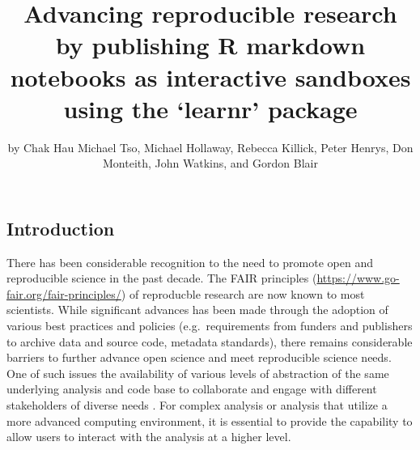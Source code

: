 \title{Advancing reproducible research by publishing R markdown notebooks as
interactive sandboxes using the `learnr' package}
\author{by Chak Hau Michael Tso, Michael Hollaway, Rebecca Killick, Peter Henrys, Don Monteith, John Watkins, and Gordon Blair}

\maketitle


\hypertarget{introduction}{%
\subsection{Introduction}\label{introduction}}

There has been considerable recognition to the need to promote open and
reproducible science in the past decade. The FAIR principles
\citep{Wilkinson2016a, Stall2019}
(\url{https://www.go-fair.org/fair-principles/}) of reproducble research
are now known to most scientists. While significant advances has been
made through the adoption of various best practices and policies
(e.g.~requirements from funders and publishers to archive data and
source code, metadata standards), there remains considerable barriers to
further advance open science and meet reproducible science needs. One of
such issues the availability of various levels of abstraction of the
same underlying analysis and code base to collaborate and engage with
different stakeholders of diverse needs \citep{Blair2019, Hollaway2020}.
For complex analysis or analysis that utilize a more advanced computing
environment, it is essential to provide the capability to allow users to
interact with the analysis at a higher level.

